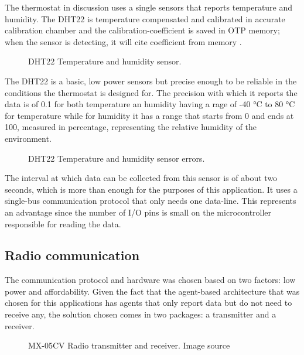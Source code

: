 \qquad The thermostat in discussion uses a single sensors that reports temperature and humidity.
The DHT22 is temperature compensated and calibrated in accurate calibration chamber and the
calibration-coefficient is saved in OTP memory; when the sensor is detecting, it will cite
coefficient from memory \cite{datasheet:dht22}.

\begin{figure}[h!]
    \label{fig:dht22}
    \centerline{}
    \caption[DHT22 Temperature and humidity sensor]{DHT22 Temperature and humidity sensor.}
    \label{fig:dht22}
\end{figure}

\qquad The DHT22 is a basic, low power sensors but precise enough to be reliable in the conditions the thermostat is
designed for. The precision with which it reports the data is of 0.1 for both temperature an humidity having a
 rage of -40 °C to 80 °C for temperature while for humidity it has a range that starts from 0 and ends at 100,
measured in percentage, representing the relative humidity of the environment.

\begin{figure}[h!]
    \label{fig:dht22_stats}
    \centerline{}
    \caption[DHT22 Temperature and humidity sensor errors]{DHT22 Temperature and humidity sensor errors.}
    \label{fig:dht22_stats}
\end{figure}

The interval at which data can be collected from this sensor is of about two seconds, which is more than
enough for the purposes of this application. It uses a single-bus communication protocol that only needs one
data-line. This represents an advantage since the number of I/O pins is small on the microcontroller
responsible for reading the data.

\subsection{Radio communication}
\label{sec:radiocomm}

\qquad The communication protocol and hardware was chosen based on two factors: low power and affordability.
Given the fact that the agent-based architecture that was chosen for this applications has agents that only
report data but do not need to receive any, the solution chosen comes in two packages: a transmitter and a
receiver.

\begin{figure}[h!]
    \label{fig:rf_tx_rx}
    \centerline{}
    \caption[MX-05CV Radio transmitter and receiver]{MX-05CV Radio transmitter and receiver. Image source
                                                     \cite{website:rf_tx_rx_img}}
    \label{fig:rf_tx_rx}
\end{figure}

